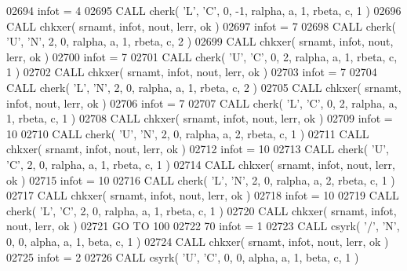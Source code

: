 \begin{DoxyCode}
02694       infot = 4
02695       \textcolor{keyword}{CALL }cherk( \textcolor{stringliteral}{'L'}, \textcolor{stringliteral}{'C'}, 0, -1, ralpha, a, 1, rbeta, c, 1 )
02696       \textcolor{keyword}{CALL }chkxer( srnamt, infot, nout, lerr, ok )
02697       infot = 7
02698       \textcolor{keyword}{CALL }cherk( \textcolor{stringliteral}{'U'}, \textcolor{stringliteral}{'N'}, 2, 0, ralpha, a, 1, rbeta, c, 2 )
02699       \textcolor{keyword}{CALL }chkxer( srnamt, infot, nout, lerr, ok )
02700       infot = 7
02701       \textcolor{keyword}{CALL }cherk( \textcolor{stringliteral}{'U'}, \textcolor{stringliteral}{'C'}, 0, 2, ralpha, a, 1, rbeta, c, 1 )
02702       \textcolor{keyword}{CALL }chkxer( srnamt, infot, nout, lerr, ok )
02703       infot = 7
02704       \textcolor{keyword}{CALL }cherk( \textcolor{stringliteral}{'L'}, \textcolor{stringliteral}{'N'}, 2, 0, ralpha, a, 1, rbeta, c, 2 )
02705       \textcolor{keyword}{CALL }chkxer( srnamt, infot, nout, lerr, ok )
02706       infot = 7
02707       \textcolor{keyword}{CALL }cherk( \textcolor{stringliteral}{'L'}, \textcolor{stringliteral}{'C'}, 0, 2, ralpha, a, 1, rbeta, c, 1 )
02708       \textcolor{keyword}{CALL }chkxer( srnamt, infot, nout, lerr, ok )
02709       infot = 10
02710       \textcolor{keyword}{CALL }cherk( \textcolor{stringliteral}{'U'}, \textcolor{stringliteral}{'N'}, 2, 0, ralpha, a, 2, rbeta, c, 1 )
02711       \textcolor{keyword}{CALL }chkxer( srnamt, infot, nout, lerr, ok )
02712       infot = 10
02713       \textcolor{keyword}{CALL }cherk( \textcolor{stringliteral}{'U'}, \textcolor{stringliteral}{'C'}, 2, 0, ralpha, a, 1, rbeta, c, 1 )
02714       \textcolor{keyword}{CALL }chkxer( srnamt, infot, nout, lerr, ok )
02715       infot = 10
02716       \textcolor{keyword}{CALL }cherk( \textcolor{stringliteral}{'L'}, \textcolor{stringliteral}{'N'}, 2, 0, ralpha, a, 2, rbeta, c, 1 )
02717       \textcolor{keyword}{CALL }chkxer( srnamt, infot, nout, lerr, ok )
02718       infot = 10
02719       \textcolor{keyword}{CALL }cherk( \textcolor{stringliteral}{'L'}, \textcolor{stringliteral}{'C'}, 2, 0, ralpha, a, 1, rbeta, c, 1 )
02720       \textcolor{keyword}{CALL }chkxer( srnamt, infot, nout, lerr, ok )
02721       \textcolor{keywordflow}{GO TO} 100
02722    70 infot = 1
02723       \textcolor{keyword}{CALL }csyrk( \textcolor{stringliteral}{'/'}, \textcolor{stringliteral}{'N'}, 0, 0, alpha, a, 1, beta, c, 1 )
02724       \textcolor{keyword}{CALL }chkxer( srnamt, infot, nout, lerr, ok )
02725       infot = 2
02726       \textcolor{keyword}{CALL }csyrk( \textcolor{stringliteral}{'U'}, \textcolor{stringliteral}{'C'}, 0, 0, alpha, a, 1, beta, c, 1 )

\end{DoxyCode}
